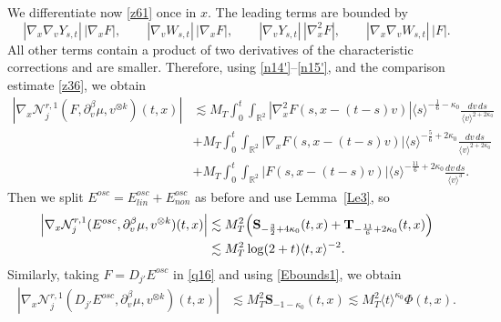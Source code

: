 \documentclass[reqno,11pt]{amsart}
\numberwithin{equation}{section}
\begin{document}
We differentiate now \eqref{z61} once in $x$. The leading terms are bounded by
\[
|\nabla_x\nabla_vY_{s,t}|\,|\nabla_xF|,\qquad |\nabla_vW_{s,t}|\,|\nabla_xF|,\qquad
|\nabla_vY_{s,t}|\,|\nabla_x^2F|,\qquad |\nabla_x\nabla_vW_{s,t}|\,|F|.
\]
All other terms contain a product of two derivatives of the characteristic corrections and are smaller. Therefore,
using \eqref{n14'}--\eqref{n15'}, and
the comparison estimate \eqref{z36}, we obtain
\begin{equation}\label{q16}
\begin{split}
\left|\nabla_x\mathcal N_j^{r,1}
(F,\partial_v^\beta\mu,v^{\otimes k})(t,x)\right|&\lesssim
M_T\int_0^t\!\!\int_{\mathbb R^2}
|\nabla_x^2F(s,x-(t-s)v)|\langle s\rangle^{-\frac16-\kappa_0}
\frac{dv\,ds}{\langle v\rangle^{2+2\kappa_0}}\\
&+M_T\int_0^t\!\!\int_{\mathbb R^2}
|\nabla_xF(s,x-(t-s)v)|\langle s\rangle^{-\frac56+2\kappa_0}
\frac{dv\,ds}{\langle v\rangle^{2+2\kappa_0}}\\
&+M_T\int_0^t\!\!\int_{\mathbb R^2}|F(s,x-(t-s)v)|
\langle s\rangle^{-\frac{11}{6}+2\kappa_0}
\frac{dv\,ds}{\langle v\rangle^3}.
\end{split}
\end{equation}
Then we split $E^{osc}=E^{osc}_{lin}+E^{osc}_{non}$ as before and use Lemma~\ref{Le3}, so
\begin{align}
\left|\nabla_x\mathcal N_j^{r,1}
(E^{osc},\partial_v^\beta\mu,v^{\otimes k})(t,x)\right|
&\lesssim M_T^2\Big(
\mathbf S_{-\frac32+4\kappa_0}(t,x)
+\mathbf T_{-\frac{11}{6}+2\kappa_0}(t,x)
\Big)
\notag\\
&\lesssim
M_T^2\log(2+t)\langle t,x\rangle^{-2}.
\label{q23}
\end{align}
Similarly, taking $F=D_{j'}E^{osc}$ in \eqref{q16} and using \eqref{Ebounds1}, we obtain
\begin{align}
\left|\nabla_x\mathcal N_j^{r,1}
(D_{j'}E^{osc},\partial_v^\beta\mu,v^{\otimes k})(t,x)\right|
&\lesssim M_T^2\mathbf S_{-1-\kappa_0}(t,x)\lesssim
M_T^2\langle t\rangle^{\kappa_0}\Phi(t,x).
\label{q24}
\end{align}
\end{document}
